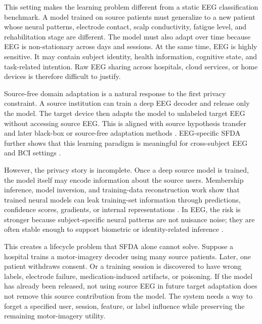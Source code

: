 \documentclass[10pt,twocolumn]{article}
\begin{document}
This setting makes the learning problem different from a static EEG classification benchmark. A model trained on source patients must generalize to a new patient whose neural patterns, electrode contact, scalp conductivity, fatigue level, and rehabilitation stage are different. The model must also adapt over time because EEG is non-stationary across days and sessions. At the same time, EEG is highly sensitive. It may contain subject identity, health information, cognitive state, and task-related intention. Raw EEG sharing across hospitals, cloud services, or home devices is therefore difficult to justify.

Source-free domain adaptation is a natural response to the first privacy constraint. A source institution can train a deep EEG decoder and release only the model. The target device then adapts the model to unlabeled target EEG without accessing source EEG. This is aligned with source hypothesis transfer and later black-box or source-free adaptation methods \cite{liang2020shot,liang2022dine,hwang2024sfda2,tang2025prode}. EEG-specific SFDA further shows that this learning paradigm is meaningful for cross-subject EEG and BCI settings \cite{li2025spdim,peng2025pdcc}.

However, the privacy story is incomplete. Once a deep source model is trained, the model itself may encode information about the source users. Membership inference, model inversion, and training-data reconstruction work show that trained neural models can leak training-set information through predictions, confidence scores, gradients, or internal representations \cite{fredrikson2015model,shokri2017membership,balle2022reconstructing,carlini2022membership}. In EEG, the risk is stronger because subject-specific neural patterns are not nuisance noise; they are often stable enough to support biometric or identity-related inference \cite{martinovic2012bci,frank2017subliminal,wang2025idremoval}.

This creates a lifecycle problem that SFDA alone cannot solve. Suppose a hospital trains a motor-imagery decoder using many source patients. Later, one patient withdraws consent. Or a training session is discovered to have wrong labels, electrode failure, medication-induced artifacts, or poisoning. If the model has already been released, not using source EEG in future target adaptation does not remove this source contribution from the model. The system needs a way to forget a specified user, session, feature, or label influence while preserving the remaining motor-imagery utility.
\end{document}
